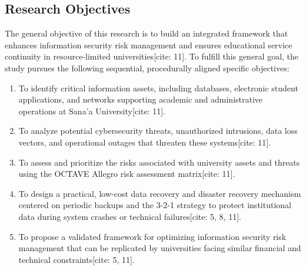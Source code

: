 \documentclass[journal,onecolumn,12pt,twoside]{IEEEtran}
\begin{document}
	\subsection{Research Objectives}
	\label{subsec:objectives}
	The general objective of this research is to build an integrated framework that enhances information security risk management and ensures educational service continuity in resource-limited universities[cite: 11]. To fulfill this general goal, the study pursues the following sequential, procedurally aligned specific objectives:
	\begin{enumerate}
		\item To identify critical information assets, including databases, electronic student applications, and networks supporting academic and administrative operations at Sana'a University[cite: 11].
		\item To analyze potential cybersecurity threats, unauthorized intrusions, data loss vectors, and operational outages that threaten these systems[cite: 11].
		\item To assess and prioritize the risks associated with university assets and threats using the OCTAVE Allegro risk assessment matrix[cite: 11].
		\item To design a practical, low-cost data recovery and disaster recovery mechanism centered on periodic backups and the 3-2-1 strategy to protect institutional data during system crashes or technical failures[cite: 5, 8, 11].
		\item To propose a validated framework for optimizing information security risk management that can be replicated by universities facing similar financial and technical constraints[cite: 5, 11].
	\end{enumerate}
	
\end{document}
